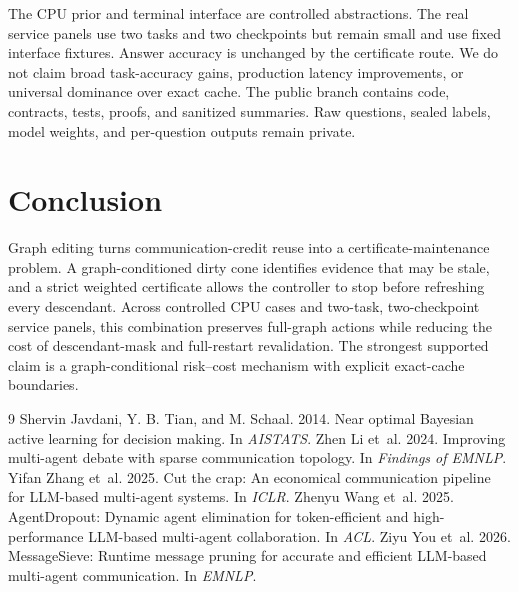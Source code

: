 \documentclass[11pt]{article}
\begin{document}
The CPU prior and terminal interface are controlled abstractions. The real service panels use two tasks and two checkpoints but remain small and use fixed interface fixtures. Answer accuracy is unchanged by the certificate route. We do not claim broad task-accuracy gains, production latency improvements, or universal dominance over exact cache. The public branch contains code, contracts, tests, proofs, and sanitized summaries. Raw questions, sealed labels, model weights, and per-question outputs remain private.

\section{Conclusion}
Graph editing turns communication-credit reuse into a certificate-maintenance problem. A graph-conditioned dirty cone identifies evidence that may be stale, and a strict weighted certificate allows the controller to stop before refreshing every descendant. Across controlled CPU cases and two-task, two-checkpoint service panels, this combination preserves full-graph actions while reducing the cost of descendant-mask and full-restart revalidation. The strongest supported claim is a graph-conditional risk--cost mechanism with explicit exact-cache boundaries.


\begin{thebibliography}{9}
Shervin Javdani, Y. B. Tian, and M. Schaal. 2014. Near optimal Bayesian active learning for decision making. In \emph{AISTATS}.
Zhen Li et~al. 2024. Improving multi-agent debate with sparse communication topology. In \emph{Findings of EMNLP}.
Yifan Zhang et~al. 2025. Cut the crap: An economical communication pipeline for LLM-based multi-agent systems. In \emph{ICLR}.
Zhenyu Wang et~al. 2025. AgentDropout: Dynamic agent elimination for token-efficient and high-performance LLM-based multi-agent collaboration. In \emph{ACL}.
Ziyu You et~al. 2026. MessageSieve: Runtime message pruning for accurate and efficient LLM-based multi-agent communication. In \emph{EMNLP}.
\end{thebibliography}
\end{document}
